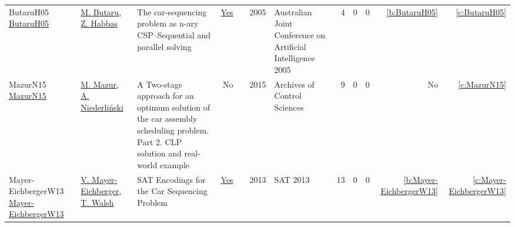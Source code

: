 {\begin{longtable}{>{\raggedright\arraybackslash}p{3cm}>{\raggedright\arraybackslash}p{6cm}>{\raggedright\arraybackslash}p{6.5cm}rrrp{2.5cm}rrrrr}
ButaruH05 \href{}{ButaruH05} & \hyperref[auth:a29]{M. Butaru}, \hyperref[auth:a30]{Z. Habbas} & The car-sequencing problem as n-ary CSP--Sequential and parallel solving & \href{../cars/works/ButaruH05.pdf}{Yes} & \cite{ButaruH05} & 2005 & Australian Joint Conference on Artificial Intelligence 2005 & 4 & 0 & 0 & \ref{b:ButaruH05} & \ref{c:ButaruH05}\\
MazurN15 \href{}{MazurN15} & \hyperref[auth:a31]{M. Mazur}, \hyperref[auth:a32]{A. Niederli{\'n}ski} & A Two-stage approach for an optimum solution of the car assembly scheduling problem. Part 2. CLP solution and real-world example & No & \cite{MazurN15} & 2015 & Archives of Control Sciences & 9 & 0 & 0 & No & \ref{c:MazurN15}\\
Mayer-EichbergerW13 \href{https://doi.org/10.29007/jrsp}{Mayer-EichbergerW13} & \hyperref[auth:a35]{V. Mayer{-}Eichberger}, \hyperref[auth:a36]{T. Walsh} & {SAT} Encodings for the Car Sequencing Problem & \href{../cars/works/Mayer-EichbergerW13.pdf}{Yes} & \cite{Mayer-EichbergerW13} & 2013 & SAT 2013 & 13 & 0 & 0 & \ref{b:Mayer-EichbergerW13} & \ref{c:Mayer-EichbergerW13}\\
\end{longtable}
}

